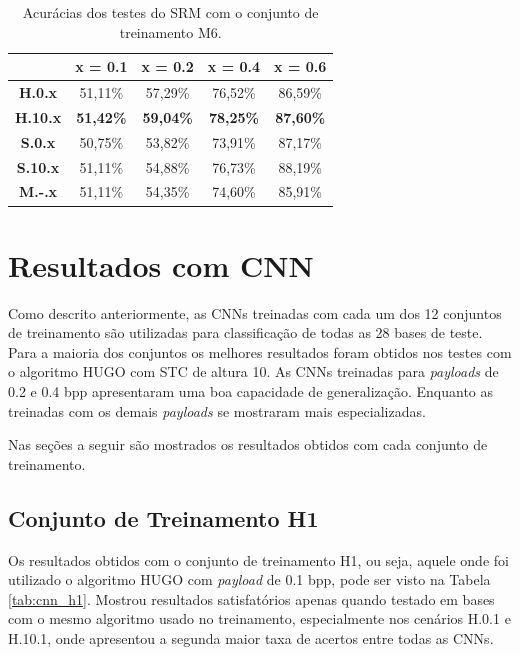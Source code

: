 \begin{table}[!htb]
\centering
\begin{tabular}{c|c|c|c|c|}
\cline{2-5}
\textbf{}                             & \textbf{x = 0.1} & \textbf{x = 0.2} & \textbf{x = 0.4} & \textbf{x = 0.6} \\ \hline
\multicolumn{1}{|c|}{\textbf{H.0.x}}  & 51,11\%          & 57,29\%          & 76,52\%          & 86,59\%          \\ \hline
\multicolumn{1}{|c|}{\textbf{H.10.x}} & \textbf{51,42\%} & \textbf{59,04\%} & \textbf{78,25\%} & \textbf{87,60\%} \\ \hline
\multicolumn{1}{|c|}{\textbf{S.0.x}}  & 50,75\%          & 53,82\%          & 73,91\%          & 87,17\%          \\ \hline
\multicolumn{1}{|c|}{\textbf{S.10.x}} & 51,11\%          & 54,88\%         & 76,73\%          & 88,19\%          \\ \hline
\multicolumn{1}{|c|}{\textbf{M.-.x}}  & 51,11\%          & 54,35\%          & 74,60\%          & 85,91\%          \\ \hline
\end{tabular}
\caption{Acurácias dos testes do SRM com o conjunto de treinamento M6.}
\label{tab:srm_m6}

\end{table}



\section{Resultados com CNN}

Como descrito anteriormente, as CNNs treinadas com cada um dos 12 conjuntos de treinamento são utilizadas para classificação de todas as 28 bases de teste. Para a maioria dos conjuntos os melhores resultados foram obtidos nos testes com o algoritmo HUGO com STC de altura 10. As CNNs treinadas para \textit{payloads} de 0.2 e 0.4 bpp apresentaram uma boa capacidade de generalização. Enquanto as treinadas com os demais \textit{payloads} se mostraram mais especializadas.

Nas seções a seguir são mostrados os resultados obtidos com cada conjunto de treinamento. 


\subsection{Conjunto de Treinamento H1}

Os resultados obtidos com o conjunto de treinamento H1, ou seja, aquele onde foi utilizado o algoritmo HUGO com \textit{payload} de 0.1 bpp, pode ser visto na Tabela \ref{tab:cnn_h1}. Mostrou resultados satisfatórios apenas quando testado em bases com o mesmo algoritmo usado no treinamento, especialmente nos cenários H.0.1 e H.10.1, onde apresentou a segunda maior taxa de acertos entre todas as CNNs.


